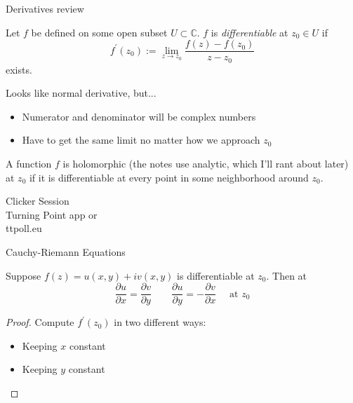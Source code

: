 \documentclass{beamer}
\newcommand{\C}{\mathbb{C}}
\begin{document}
\begin{frame}{Derivatives review}
\begin{definition} Let $f$ be defined on some open subset $U\subset \C$.  $f$ is \emph{differentiable} at $z_0\in U$ if
$$f^\prime(z_0):=\lim_{z\to z_0}\frac{f(z)-f(z_0)}{z-z_0}$$ 
exists.
\end{definition}
\begin{block}{Looks like normal derivative, but...}
\begin{itemize}
    \item Numerator and denominator will be complex numbers
    \item Have to get the same limit no matter how we approach $z_0$
\end{itemize}
\end{block}
\begin{definition} A function $f$ is holomorphic (the notes use analytic, which I'll rant about later) at $z_0$ if it is differentiable at every point in some neighborhood around $z_0$.
  \end{definition}

\end{frame}

\begin{frame}
  
\begin{center}

\Huge

Clicker Session \\
Turning Point app or \\
ttpoll.eu 

\end{center}

\end{frame}

\begin{frame}{Cauchy-Riemann Equations}

\begin{theorem}
Suppose $f(z)=u(x,y)+iv(x,y)$ is differentiable at $z_0$.  Then at 
$$\frac{\partial u}{\partial x}=\frac{\partial v}{\partial y}\quad\quad\frac{\partial u}{\partial y}=-\frac{\partial v}{\partial x}\quad \text{ at } z_0$$
\end{theorem}

\begin{proof}
Compute $f^\prime(z_0)$ in two different ways:
\begin{itemize}
    \item Keeping $x$ constant
    \item Keeping $y$ constant
\end{itemize}
\end{proof}

\end{frame}
\end{document}
